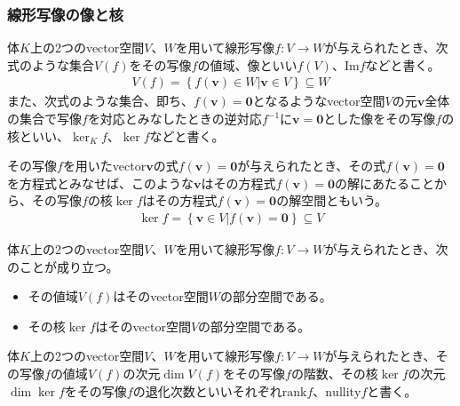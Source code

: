 \documentclass[dvipdfmx]{jsarticle}
\begin{document}
\subsubsection{線形写像の像と核}%
\begin{dfn}\label{線形写像の像と核}
体$K$上の2つのvector空間$V$、$W$を用いて線形写像$f:V \rightarrow W$が与えられたとき、次式のような集合$V(f)$をその写像$f$の値域、像といい$f(V)$、$\mathrm{Im}f$などと書く。
\begin{align*}
V(f) = \left\{ f\left( \mathbf{v} \right) \in W|\mathbf{v} \in V \right\} \subseteq W
\end{align*}
また、次式のような集合、即ち、$f\left( \mathbf{v} \right) = \mathbf{0}$となるようなvector空間$V$の元$\mathbf{v}$全体の集合で写像$f$を対応とみなしたときの逆対応$f^{- 1}$に$\mathbf{v} = \mathbf{0}$とした像をその写像$f$の核といい、$\ker_{K}f$、$\ker f$などと書く。
\end{dfn}\par
その写像$f$を用いたvector$\mathbf{v}$の式$f\left( \mathbf{v} \right) = \mathbf{0}$が与えられたとき、その式$f\left( \mathbf{v} \right) = \mathbf{0}$を方程式とみなせば、このような$\mathbf{v}$はその方程式$f\left( \mathbf{v} \right) = \mathbf{0}$の解にあたることから、その写像$f$の核$\ker f$はその方程式$f\left( \mathbf{v} \right) = \mathbf{0}$の解空間ともいう。
\begin{align*}
\ker f = \left\{ \mathbf{v} \in V|f\left( \mathbf{v} \right) = \mathbf{0} \right\} \subseteq V
\end{align*}
\begin{thm}\label{2.1.2.11}
体$K$上の2つのvector空間$V$、$W$を用いて線形写像$f:V \rightarrow W$が与えられたとき、次のことが成り立つ。
\begin{itemize}
\item
  その値域$V(f)$はそのvector空間$W$の部分空間である。
\item
  その核$\ker f$はそのvector空間$V$の部分空間である。
\end{itemize}
\end{thm}
\begin{dfn}\label{線形写像の階数と退化次数}
体$K$上の2つのvector空間$V$、$W$を用いて線形写像$f:V \rightarrow W$が与えられたとき、その写像$f$の値域$V(f)$の次元$\dim{V(f)}$をその写像$f$の階数、その核$\ker f$の次元$\dim{\ker f}$をその写像$f$の退化次数といいそれぞれ${\mathrm{rank}}f$、${\mathrm{nullity}}f$と書く。
\end{dfn}
\end{document}
